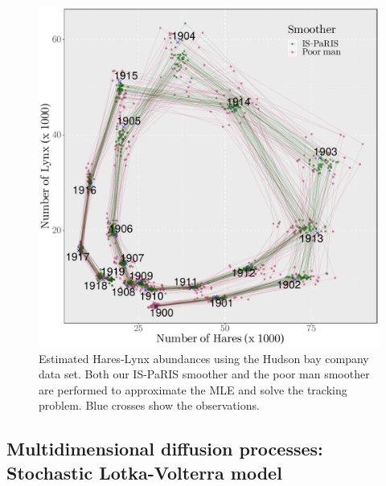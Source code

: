 \documentclass{article}
\begin{document}
\begin{figure}
\begin{center}
\includegraphics[scale = 0.4]{smoothing_hares_lynx.pdf}
\end{center}
\caption{\label{fig:LV:hares:lynx} Estimated Hares-Lynx abundances using the Hudson bay company data set. Both our IS-PaRIS smoother and the poor man smoother are performed to approximate the MLE and solve the tracking problem. Blue crosses show the observations.}
\end{figure}

\subsection{Multidimensional diffusion processes: Stochastic Lotka-Volterra model}
\label{sec:simu:LV}
\end{document}
